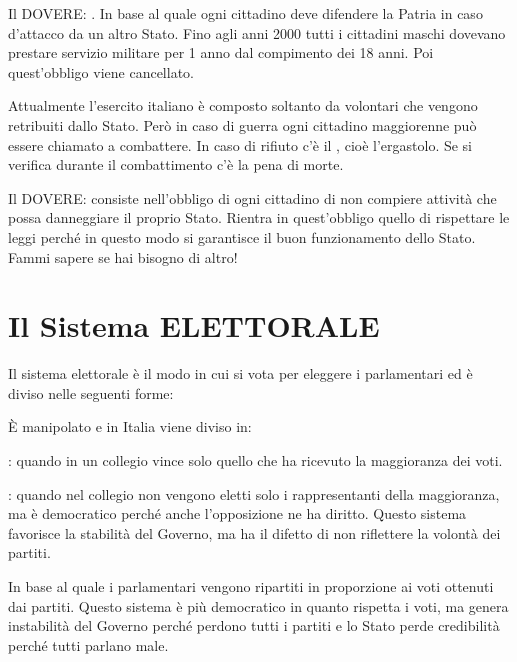 \documentclass[letterpaper,10pt,italian]{sphinxmanual}
\begin{document}
\sphinxAtStartPar
Il  DOVERE: . In base al quale ogni cittadino deve difendere
la Patria in caso d’attacco da un altro Stato.
Fino agli anni 2000 tutti i cittadini maschi dovevano prestare servizio militare per 1 anno dal compimento dei 18 anni. Poi quest’obbligo viene cancellato.

\sphinxAtStartPar
Attualmente l’esercito italiano è composto soltanto da volontari che vengono retribuiti dallo Stato. Però in caso di guerra ogni cittadino maggiorenne può essere chiamato a combattere. In caso di rifiuto c’è il , cioè l’ergastolo. Se si verifica durante il combattimento c’è la pena di morte.

\sphinxAtStartPar
Il  DOVERE:  consiste nell’obbligo di ogni cittadino di non compiere attività che possa danneggiare il proprio Stato. Rientra in quest’obbligo quello di rispettare le leggi perché in questo modo si garantisce il buon funzionamento dello Stato.
Fammi sapere se hai bisogno di altro!

\sphinxstepscope


\chapter{Il Sistema ELETTORALE}
\label{\detokenize{Sistema Elettorale:il-sistema-elettorale}}\label{\detokenize{Sistema Elettorale::doc}}
\sphinxAtStartPar
Il sistema elettorale è il modo in cui si vota per eleggere i parlamentari ed è diviso nelle seguenti forme:

\sphinxAtStartPar
{}

\sphinxAtStartPar
È manipolato e in Italia viene diviso in:

\sphinxAtStartPar
{}: quando in un collegio vince solo quello che ha ricevuto la maggioranza dei voti.

\sphinxAtStartPar
{}: quando nel collegio non vengono eletti solo i rappresentanti della maggioranza,
ma è democratico perché anche l’opposizione ne ha diritto.
Questo sistema favorisce la stabilità del Governo, ma ha il difetto di non riflettere la volontà dei partiti.

\sphinxAtStartPar
{}

\sphinxAtStartPar
In base al quale i parlamentari vengono ripartiti in proporzione ai voti ottenuti dai partiti.
Questo sistema è più democratico in quanto rispetta i voti, ma genera instabilità del Governo
perché perdono tutti i partiti e lo Stato perde credibilità perché tutti parlano male.
\end{document}
